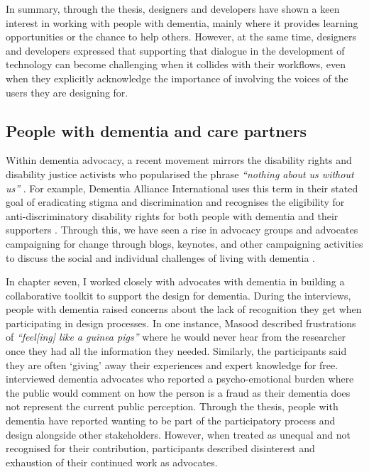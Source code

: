 In summary, through the thesis, designers and developers have shown a keen interest in working with people with dementia, mainly where it provides learning opportunities or the chance to help others. However, at the same time, designers and developers expressed that supporting that dialogue in the development of technology can become challenging when it collides with their workflows, even when they explicitly acknowledge the importance of involving the voices of the users they are designing for.

\subsection{People with dementia and care partners}
\label{PwDInterests}
Within dementia advocacy, a recent movement mirrors the disability rights and disability justice activists who popularised the phrase \textit{``nothing about us without us''} \citep{spiel_nothing_2020}. For example, Dementia Alliance International uses this term in their stated goal of eradicating stigma and discrimination and recognises the eligibility for anti-discriminatory disability rights for both people with dementia and their supporters \citep{oldfield2021nothing}. Through this, we have seen a rise in advocacy groups and advocates campaigning for change through blogs, keynotes, and other campaigning activities to discuss the social and individual challenges of living with dementia \citep{thomas2018dementia}.

In chapter seven, I worked closely with advocates with dementia in building a collaborative toolkit to support the design for dementia. During the interviews, people with dementia raised concerns about the lack of recognition they get when participating in design processes. In one instance, Masood described frustrations of \textit{``feel[ing] like a guinea pigs''} where he would never hear from the researcher once they had all the information they needed. Similarly, the participants said they are often `giving' away their experiences and expert knowledge for free. \cite{wiersma2016creating} interviewed dementia advocates who reported a psycho-emotional burden where the public would comment on how the person is a fraud as their dementia does not represent the current public perception. Through the thesis, people with dementia have reported wanting to be part of the participatory process and design alongside other stakeholders. However, when treated as unequal and not recognised for their contribution, participants described disinterest and exhaustion of their continued work as advocates. 

